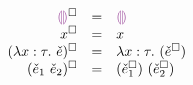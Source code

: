 \newcommand{\erasesToRow}[2]{\erase{#1} & = & #2}
\begin{figure}[htbp]
  \[\begin{array}{rcl}
    \erasesToRow{\ECEHole}{\EEHole} \\
    \erasesToRow{x}{x} \\
    \erasesToRow{(\ECLam{x}{\TMV}{\ECMV})}{\ELam{x}{\TMV}{(\erase{\ECMV})}} \\
    \erasesToRow{(\ECAp{\ECMV_1}{\ECMV_2})}{\EAp{(\erase{\ECMV_1})}{(\erase{\ECMV_2})}} \\

\end{array}\]
\end{figure}
